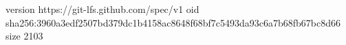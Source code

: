 version https://git-lfs.github.com/spec/v1
oid sha256:3960a3edf2507bd379dc1b4158ac8648f68bf7c5493da93c6a7b68fb67bc8d66
size 2103
